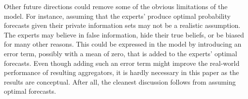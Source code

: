 \documentclass[11pt,twoside]{article}
\theoremstyle{definition}
\theoremstyle{definition}
\begin{document}
 
 Other future directions could  remove some of the obvious limitations of the model. For instance, assuming that the experts' produce optimal probability forecasts given their private information sets may not be a realistic assumption. The experts may believe in false information, hide their true beliefs, or be biased for many other reasons. This could be expressed in the model by introducing an error term, possibly with a mean of zero, that is added to the experts' optimal forecasts. Even though adding such an error term might improve the real-world performance of resulting aggregators, it is hardly necessary in this paper as the results are conceptual. After all, the cleanest discussion follows from assuming optimal forecasts. 
 
% 

 
 
 


%

\end{document}
